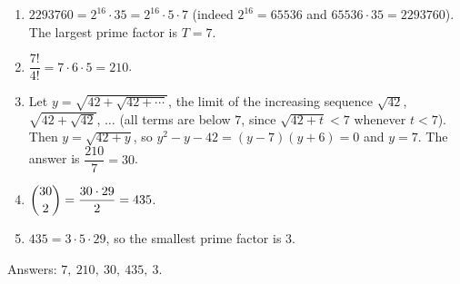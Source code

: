 \begin{enumerate}
\item $2293760=2^{16}\cdot35=2^{16}\cdot5\cdot7$ (indeed $2^{16}=65536$ and $65536\cdot35=2293760$). The largest prime factor is $T=7$.
\item $\dfrac{7!}{4!}=7\cdot6\cdot5=210$.
\item Let $y=\sqrt{42+\sqrt{42+\cdots}}$, the limit of the increasing sequence $\sqrt{42}$, $\sqrt{42+\sqrt{42}}$, $\dots$ (all terms are below $7$, since $\sqrt{42+t}<7$ whenever $t<7$). Then $y=\sqrt{42+y}$, so $y^2-y-42=(y-7)(y+6)=0$ and $y=7$. The answer is $\dfrac{210}{7}=30$.
\item $\dbinom{30}{2}=\dfrac{30\cdot29}{2}=435$.
\item $435=3\cdot5\cdot29$, so the smallest prime factor is $\boxed{3}$.
\end{enumerate}
Answers: $7,\ 210,\ 30,\ 435,\ 3$.
